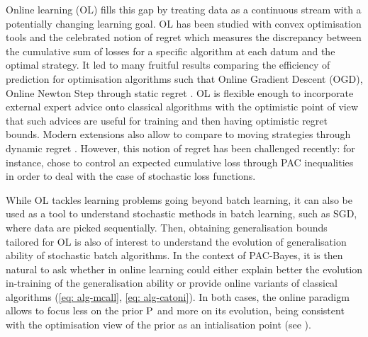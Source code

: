  Online learning (OL)  \citep{zinkevich2003online,shalev2012online,hazan2016introduction} fills this gap by treating data as a continuous stream with a potentially changing learning goal.
 OL has been studied with convex optimisation tools and the celebrated notion of regret which measures the discrepancy between the cumulative sum of losses for a specific algorithm at each datum and the optimal strategy. It led to many fruitful results comparing the  efficiency of prediction for optimisation algorithms such that Online Gradient Descent (OGD), Online Newton Step through static regret \citep{zinkevich2003online,hazan2007logarithmic}. OL is flexible enough to incorporate external expert advice onto classical algorithms with the optimistic point of view that such advices are useful for training \citep{rakhlin2013online,rakhlin2013practical} and then having optimistic regret bounds.
 Modern extensions also allow to compare to moving strategies through dynamic regret \citep[see e.g.][]{yang2016tracking,zhang2018strong,zhao2020dyn}. However, this notion of regret has been challenged recently: for instance, \citet{wintenberger2021stochastic} chose to control an expected cumulative loss through PAC inequalities in order to deal with the case of stochastic loss functions.

While OL tackles learning problems going beyond batch learning, it can also be used as a tool to understand stochastic methods in batch learning, such as SGD, where data are picked sequentially. Then, obtaining generalisation bounds tailored for OL is also of interest to understand the evolution of generalisation ability of stochastic batch algorithms. In the context of PAC-Bayes, it is then natural to ask whether in online learning could either explain better the evolution in-training of the generalisation ability or provide online variants of classical algorithms (\eg \eqref{eq: alg-mcall}, \eqref{eq: alg-catoni}). In both cases, the online paradigm allows to focus less on the prior $\P$ and more on its evolution, being consistent with the optimisation view of the prior as an intialisation point (see ). 

